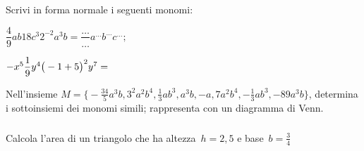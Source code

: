 \subsubsection*{}

% 

\begin{esercizio}
\label{ese:9.2}
Scrivi in forma normale i seguenti monomi:
\begin{multicols}{2}
 \(\dfrac{4}{9}ab18c^{3}2^{-2}a^{3}b=\dfrac{\ldots }{\ldots }a^{\ldots}b^{\ldots 
}c^{\ldots };\)

 \(-x^{5}\dfrac{1}{9}y^{4}\big(-1+5\big)^{2}y^{7}=\dotfill~\)
\end{multicols}
\end{esercizio}

\begin{esercizio}
\label{ese:9.3}
Nell'insieme
\(M=\big\{-{\frac{34}{5}}a^{3}b, 3^{2}a^{2}b^{4}, \frac{1}{3}ab^{3}, a^{3}b, -a, 
7a^{2}b^{4}, -\frac{1}{3}ab^{3}, -89a^{3}b\big\}\),
determina i sottoinsiemi dei monomi simili; rappresenta con un diagramma di 
Venn.
\end{esercizio}

\subsubsection*{}

\begin{esercizio}
\label{ese:9.4}
Calcola l'area di un triangolo che ha altezza~\(h=2,5\) e base~\(b=\frac{3}{4}\)
\end{esercizio}

